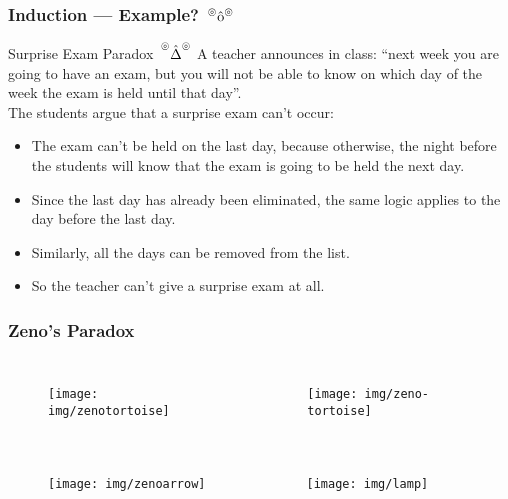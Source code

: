 \documentclass[UTF8,11pt,colorlinks,compress,openany]{beamer}%
\begin{document}
\begin{frame}\frametitle{Induction --- Example? $\sideset{^\circledcirc}{^\circledcirc}{\operatorname{\hat{o}}}$}
	\begin{block}{Surprise Exam Paradox $\sideset{^{\circledcirc}}{^{\circledcirc}}{\operatorname{\hat{\Delta}}}$}
		A teacher announces in class: ``next week you are going to have an exam, but you will not be able to know on which day of the week the exam is held until that day''.\\
		The students argue that a surprise exam can't occur:
		\begin{itemize}
			\item The exam can't be held on the last day, because otherwise, the night before the students will know that the exam is going to be held the next day.
			\item Since the last day has already been eliminated, the same logic applies to the day before the last day.
			\item Similarly, all the days can be removed from the list.
			\item So the teacher can't give a surprise exam at all.
		\end{itemize}
	\end{block}
\end{frame}

\begin{frame}\frametitle{Zeno's Paradox}\vspace{-5pt}
	\begin{columns}
			\begin{figure}
				\texttt{[image: img/zenotortoise]}
			\end{figure}
			\begin{figure}
				\texttt{[image: img/zeno-tortoise]}
			\end{figure}
	\end{columns}\vspace{-8pt}
	\begin{columns}
			\begin{figure}
				\texttt{[image: img/zenoarrow]}
			\end{figure}
			\begin{figure}
				\texttt{[image: img/lamp]}
			\end{figure}
	\end{columns}
\end{frame}
\end{document}
